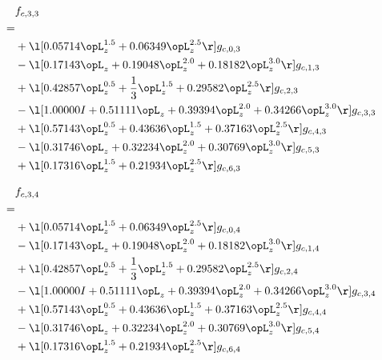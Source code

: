 \begin{alignat}{2} 
\label{eq:f_33_0} 
& f_{c,3,3} \nonumber \\ 
 = \\ 
& + \l[  0.05714 \opL_z^{1.5} +  0.06349 \opL_z^{2.5}  \r] g_{c,0,3} \nonumber \\ 
& - \l[  0.17143 \opL_z +  0.19048 \opL_z^{2.0} +  0.18182 \opL_z^{3.0}  \r] g_{c,1,3} \nonumber \\ 
& + \l[  0.42857 \opL_z^{0.5} + \frac{1}{3} \opL_z^{1.5} +  0.29582 \opL_z^{2.5}  \r] g_{c,2,3} \nonumber \\ 
& - \l[  1.00000 I +  0.51111 \opL_z +  0.39394 \opL_z^{2.0} +  0.34266 \opL_z^{3.0}  \r] g_{c,3,3} \nonumber \\ 
& + \l[  0.57143 \opL_z^{0.5} +  0.43636 \opL_z^{1.5} +  0.37163 \opL_z^{2.5}  \r] g_{c,4,3} \nonumber \\ 
& - \l[  0.31746 \opL_z +  0.32234 \opL_z^{2.0} +  0.30769 \opL_z^{3.0}  \r] g_{c,5,3} \nonumber \\ 
& + \l[  0.17316 \opL_z^{1.5} +  0.21934 \opL_z^{2.5}  \r] g_{c,6,3} \nonumber \\ 
\end{alignat} 


\begin{alignat}{2} 
\label{eq:f_34_0} 
& f_{c,3,4} \nonumber \\ 
 = \\ 
& + \l[  0.05714 \opL_z^{1.5} +  0.06349 \opL_z^{2.5}  \r] g_{c,0,4} \nonumber \\ 
& - \l[  0.17143 \opL_z +  0.19048 \opL_z^{2.0} +  0.18182 \opL_z^{3.0}  \r] g_{c,1,4} \nonumber \\ 
& + \l[  0.42857 \opL_z^{0.5} + \frac{1}{3} \opL_z^{1.5} +  0.29582 \opL_z^{2.5}  \r] g_{c,2,4} \nonumber \\ 
& - \l[  1.00000 I +  0.51111 \opL_z +  0.39394 \opL_z^{2.0} +  0.34266 \opL_z^{3.0}  \r] g_{c,3,4} \nonumber \\ 
& + \l[  0.57143 \opL_z^{0.5} +  0.43636 \opL_z^{1.5} +  0.37163 \opL_z^{2.5}  \r] g_{c,4,4} \nonumber \\ 
& - \l[  0.31746 \opL_z +  0.32234 \opL_z^{2.0} +  0.30769 \opL_z^{3.0}  \r] g_{c,5,4} \nonumber \\ 
& + \l[  0.17316 \opL_z^{1.5} +  0.21934 \opL_z^{2.5}  \r] g_{c,6,4} \nonumber \\ 
\end{alignat} 


